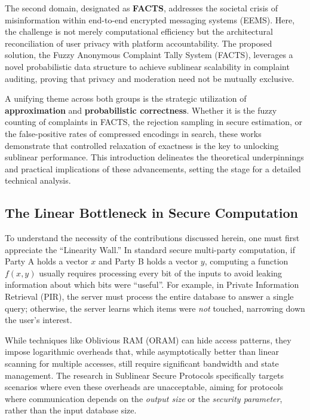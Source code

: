 The second domain, designated as \textbf{FACTS}, addresses the societal crisis of misinformation within end-to-end encrypted messaging systems (EEMS). Here, the challenge is not merely computational efficiency but the architectural reconciliation of user privacy with platform accountability. The proposed solution, the Fuzzy Anonymous Complaint Tally System (FACTS), leverages a novel probabilistic data structure to achieve sublinear scalability in complaint auditing, proving that privacy and moderation need not be mutually exclusive.

A unifying theme across both groups is the strategic utilization of \textbf{approximation} and \textbf{probabilistic correctness}. Whether it is the fuzzy counting of complaints in FACTS, the rejection sampling in secure estimation, or the false-positive rates of compressed encodings in search, these works demonstrate that controlled relaxation of exactness is the key to unlocking sublinear performance. This introduction delineates the theoretical underpinnings and practical implications of these advancements, setting the stage for a detailed technical analysis.

\subsection{The Linear Bottleneck in Secure Computation}
To understand the necessity of the contributions discussed herein, one must first appreciate the ``Linearity Wall.'' In standard secure multi-party computation, if Party A holds a vector $x$ and Party B holds a vector $y$, computing a function $f(x, y)$ usually requires processing every bit of the inputs to avoid leaking information about which bits were ``useful''. For example, in Private Information Retrieval (PIR), the server must process the entire database to answer a single query; otherwise, the server learns which items were \textit{not} touched, narrowing down the user's interest.

While techniques like Oblivious RAM (ORAM) can hide access patterns, they impose logarithmic overheads that, while asymptotically better than linear scanning for multiple accesses, still require significant bandwidth and state management. The research in Sublinear Secure Protocols specifically targets scenarios where even these overheads are unacceptable, aiming for protocols where communication depends on the \textit{output size} or the \textit{security parameter}, rather than the input database size.

